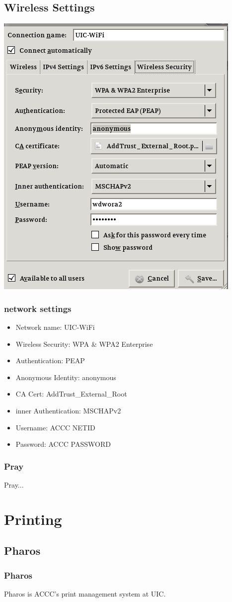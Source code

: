 \documentclass[hyperref={pdfpagelabels=false}]{beamer}
\begin{document}
\subsection{Wireless Settings}
\frame
{
     \includegraphics[totalheight=0.8\textheight]{uicwificonfig.png}
}
\frame
{
    \frametitle{network settings}
    \begin{itemize}
    \item{Network name: UIC-WiFi}
    \item{Wireless Security: WPA \& WPA2 Enterprise}
    \item{Authentication: PEAP}
    \item{Anonymous Identity: anonymous}
    \item{CA Cert: AddTrust\_External\_Root}
    \item{inner Authentication: MSCHAPv2}
    \item{Username: ACCC NETID}
    \item{Password: ACCC PASSWORD}
    \end{itemize}
}
\frame
{
    \frametitle{Pray}
    Pray...
}
\section{Printing}
\subsection{Pharos}
\frame
{
    \frametitle{Pharos}
    Pharos is ACCC's print management system at UIC.
}
\end{document}
